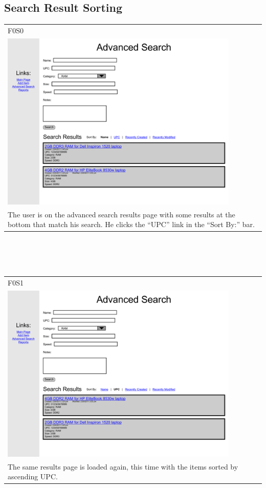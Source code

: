 \documentclass{article}
\begin{document}
\subsection{Search Result Sorting}
\begin{tabular}{ p{4.5in} }
F0S0\\
\includegraphics[keepaspectratio, width=4.5in]{sortResultsF0S0.pdf} \\
The user is on the advanced search results page with some results at the bottom that match his search. He clicks the ``UPC'' link in the ``Sort By:'' bar. 
\end{tabular}\\
~\\
~\\
\begin{tabular}{ p{4.5in} }
F0S1\\
\includegraphics[keepaspectratio, width=4.5in]{sortResultsF0S1.pdf} \\
The same results page is loaded again, this time with the items sorted by ascending UPC.
\end{tabular}
\end{document}
